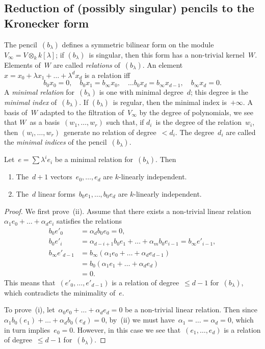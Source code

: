 \documentclass{lms}%
\begin{document}
\subsection{Reduction of (possibly singular) pencils to the Kronecker form} %
The pencil~$(b_{λ})$ defines a symmetric bilinear form on the
module~$V_{∞} = V ⊗_{k} k[λ]$; if $(b_{λ})$~is singular, then this form
has a non-trivial kernel~$W$. Elements of~$W$ are called \emph{relations}
of~$(b_{λ})$. An element~$x = x_0 + λ x_1 + … + λ^d x_d$ is a
relation iff
\begin{equation}\label{eq:relation}
b_0 x_0 = 0, \quad
b_0 x_1 = b_{∞} x_0, \quad …
b_0 x_d = b_{∞} x_{d-1}, \quad
b_{∞} x_{d} = 0.
\end{equation}
A \emph{minimal relation} for~$(b_{λ})$ is one with minimal degree~$d$;
this degree is the \emph{minimal index} of~$(b_{λ})$. If $(b_{λ})$~is
regular, then the minimal index is~$+∞$. A basis of~$W$ adapted to the
filtration of~$V_{∞}$ by the degree of polynomials, we see that $W$~as a
basis~$(w_1,…,w_r)$ such that, if $d_i$~is the degree of the
relation~$w_i$, then $(w_i,…,w_r)$~generate no relation of degree~$<
d_i$. The degree~$d_i$ are called the \emph{minimal indices} of the
pencil~$(b_{λ})$.
\begin{prop}\label{prop:minimal-indep}%
Let~$e = ∑ λ^i e_i$ be a minimal relation for~$(b_{λ})$. Then
\begin{enumerate}
\item The~$d+1$ vectors~$e_0, …, e_d$ are $k$-linearly independent.
\item The~$d$ linear forms~$b_{0} e_1, …, b_{0} e_d$ are $k$-linearly
independent.
\end{enumerate}
\end{prop}

\begin{proof}
We first prove~(ii). Assume that there exists a non-trivial linear
relation~$α_1 e_0 + … + α_d e_{i}$ satisfies the relations
\begin{equation}\label{eq:relation-e'}
\begin{split}
b_0 e'_0 &= α_d b_0 e_0 = 0, \\
b_0 e'_i &= α_{d-i+1} b_0 e_1 + … + α_m b_0 e_{i-1} = b_{∞} e'_{i-1}, \\
b_{∞} e'_{d-1} &= b_{∞} (α_1 e_{0} + … + α_{d} e_{d-1}) \\
 &= b_{0} (α_1 e_{1} + … + α_{d} e_{d}) \\
 &= 0.
\end{split}
\end{equation}
This means that~$(e'_0,…,e'_{d-1})$ is a relation of degree~$≤ d-1$
for~$(b_{λ})$, which contradicts the minimality of~$e$.

To prove~(i), let~$α_0 e_0 + … + α_d e_d = 0$ be a non-trivial linear
relation. Then since $α_1 b_0(e_1) + … + α_d b_0(e_d) = 0$, by~(ii) we
must have~$α_1 = … = α_d = 0$, which in turn implies~$e_0 = 0$. However,
in this case we see that~$(e_1,…,e_d)$ is a relation of degree~$≤ d-1$
for~$(b_{λ})$.
\end{proof}
\end{document}
